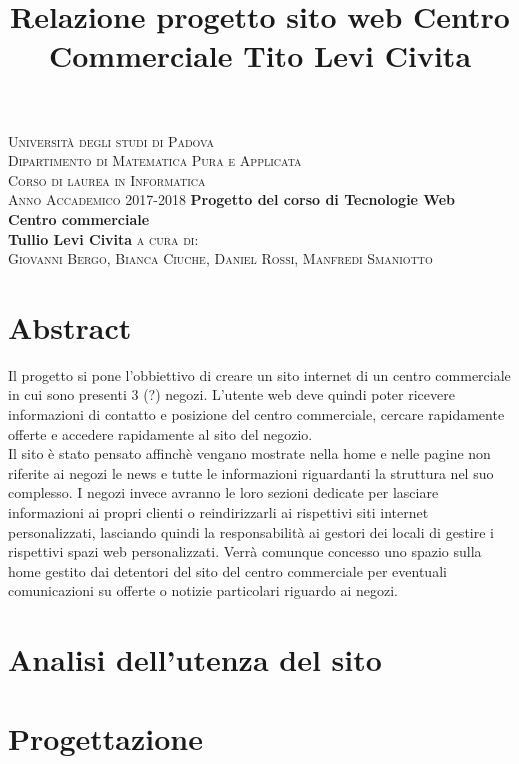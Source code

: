 \documentclass[a4paper,11pt]{article}
\begin{document}
\pagestyle{empty}	


\title{Relazione progetto sito web Centro Commerciale Tito Levi Civita}
\begin{minipage}[c][\textheight][c]{\textwidth}\centering
	\textsc{Universit\`a degli studi di Padova}
	\\ \noindent
	\textsc{Dipartimento di Matematica Pura e Applicata}
	\\ \noindent
	\textsc{Corso di laurea in Informatica}
	\\ \noindent
	\textsc{Anno Accademico 2017-2018}
	\vfill
	\textbf{\large Progetto del corso di Tecnologie Web}
	\\ \noindent
	\textbf{\huge Centro commerciale}
	\\ \noindent
	\textbf{\Huge Tullio Levi Civita}
	\vfill
	\textsc{\Large a cura di:}
	\\ \noindent
	\textsc{\Large Giovanni Bergo, Bianca Ciuche, Daniel Rossi, Manfredi Smaniotto}	
\end{minipage}

\tableofcontents
\pagebreak
\section{Abstract}
Il progetto si pone l'obbiettivo di creare un sito internet di un centro commerciale in cui sono presenti 3 (?) negozi. L'utente web deve quindi poter ricevere informazioni di contatto e posizione del centro commerciale, cercare rapidamente offerte e accedere rapidamente al sito del negozio.
\\ \noindent Il sito è stato pensato affinchè vengano mostrate nella home e nelle pagine non riferite ai negozi le news e tutte le informazioni riguardanti la struttura nel suo complesso. I negozi invece avranno le loro sezioni dedicate per lasciare informazioni ai propri clienti o reindirizzarli ai rispettivi siti internet personalizzati, lasciando quindi la responsabilità ai gestori dei locali di gestire i rispettivi spazi web personalizzati. Verrà comunque concesso uno spazio sulla home gestito dai detentori del sito del centro commerciale per eventuali comunicazioni su offerte o notizie particolari riguardo ai negozi.
\\ \noindent

\section{Analisi dell'utenza del sito}

\section{Progettazione}
	
\end{document}

